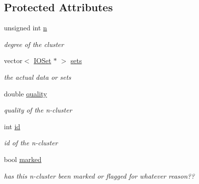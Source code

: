 \subsection*{Protected Attributes}
\begin{DoxyCompactItemize}
\item 
\hypertarget{class_n_cluster_a926e474ba279516160b52ab36d208a69}{
unsigned int \hyperlink{class_n_cluster_a926e474ba279516160b52ab36d208a69}{n}}
\label{class_n_cluster_a926e474ba279516160b52ab36d208a69}

\begin{DoxyCompactList}\small\item\em degree of the cluster \item\end{DoxyCompactList}\item 
\hypertarget{class_n_cluster_a2333af10251a6a884395aab57b9fa400}{
vector$<$ \hyperlink{class_i_o_set}{IOSet} $\ast$ $>$ \hyperlink{class_n_cluster_a2333af10251a6a884395aab57b9fa400}{sets}}
\label{class_n_cluster_a2333af10251a6a884395aab57b9fa400}

\begin{DoxyCompactList}\small\item\em the actual data or sets \item\end{DoxyCompactList}\item 
\hypertarget{class_n_cluster_a9e0aa868b02c27e6c282f9633a135aa9}{
double \hyperlink{class_n_cluster_a9e0aa868b02c27e6c282f9633a135aa9}{quality}}
\label{class_n_cluster_a9e0aa868b02c27e6c282f9633a135aa9}

\begin{DoxyCompactList}\small\item\em quality of the n-\/cluster \item\end{DoxyCompactList}\item 
\hypertarget{class_n_cluster_a9360cadd4e338b91de61f86997acc890}{
int \hyperlink{class_n_cluster_a9360cadd4e338b91de61f86997acc890}{id}}
\label{class_n_cluster_a9360cadd4e338b91de61f86997acc890}

\begin{DoxyCompactList}\small\item\em id of the n-\/cluster \item\end{DoxyCompactList}\item 
\hypertarget{class_n_cluster_a89a39f622490f47ed6283b17fe1d0f44}{
bool \hyperlink{class_n_cluster_a89a39f622490f47ed6283b17fe1d0f44}{marked}}
\label{class_n_cluster_a89a39f622490f47ed6283b17fe1d0f44}

\begin{DoxyCompactList}\small\item\em has this n-\/cluster been marked or flagged for whatever reason?? \item\end{DoxyCompactList}\end{DoxyCompactItemize}


